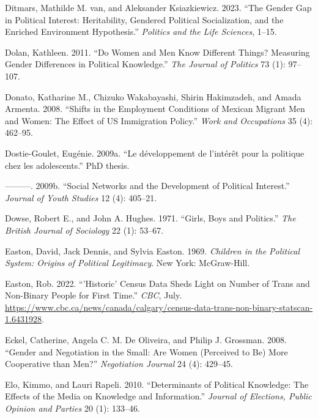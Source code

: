 \documentclass[
  letterpaper,
  DIV=11,
  numbers=noendperiod]{scrreprt}
\newlength{\cslhangindent}
\newlength{\cslentryspacingunit} %
\newenvironment{CSLReferences}[2] %
 {%
  \setlength{\parindent}{0pt}
  \ifodd #1
  \let\oldpar\par
  \def\par{\hangindent=\cslhangindent\oldpar}
  \fi
  \setlength{\parskip}{#2\cslentryspacingunit}
 }%
 {}
\begin{document}
\begin{CSLReferences}{1}{0}
\leavevmode{}%
Ditmars, Mathilde M. van, and Aleksander Ksiazkiewicz. 2023. {``{The
Gender Gap in Political Interest: Heritability, Gendered Political
Socialization, and the Enriched Environment Hypothesis}.''}
\emph{Politics and the Life Sciences}, 1--15.

\leavevmode{}%
Dolan, Kathleen. 2011. {``{Do Women and Men Know Different Things?
Measuring Gender Differences in Political Knowledge}.''} \emph{The
Journal of Politics} 73 (1): 97--107.

\leavevmode{}%
Donato, Katharine M., Chizuko Wakabayashi, Shirin Hakimzadeh, and Amada
Armenta. 2008. {``{Shifts in the Employment Conditions of Mexican
Migrant Men and Women: The Effect of US Immigration Policy}.''}
\emph{Work and Occupations} 35 (4): 462--95.

\leavevmode{}%
Dostie-Goulet, Eugénie. 2009a. {``{Le d{é}veloppement de l'int{é}r{ê}t
pour la politique chez les adolescents}.''} PhD thesis.

\leavevmode{}%
---------. 2009b. {``{Social Networks and the Development of Political
Interest}.''} \emph{Journal of Youth Studies} 12 (4): 405--21.

\leavevmode{}%
Dowse, Robert E., and John A. Hughes. 1971. {``{Girls, Boys and
Politics}.''} \emph{The British Journal of Sociology} 22 (1): 53--67.

\leavevmode{}%
Easton, David, Jack Dennis, and Sylvia Easton. 1969. \emph{{Children in
the Political System: Origins of Political Legitimacy}}. New York:
McGraw-Hill.

\leavevmode{}%
Easton, Rob. 2022. {``'Historic' Census Data Sheds Light on Number of
Trans and Non-Binary People for First Time.''} \emph{CBC}, July.
\url{https://www.cbc.ca/news/canada/calgary/census-data-trans-non-binary-statscan-1.6431928}.

\leavevmode{}%
Eckel, Catherine, Angela C. M. De Oliveira, and Philip J. Grossman.
2008. {``{Gender and Negotiation in the Small: Are Women (Perceived to
Be) More Cooperative than Men?}''} \emph{Negotiation Journal} 24 (4):
429--45.

\leavevmode{}%
Elo, Kimmo, and Lauri Rapeli. 2010. {``{Determinants of Political
Knowledge: The Effects of the Media on Knowledge and Information}.''}
\emph{Journal of Elections, Public Opinion and Parties} 20 (1): 133--46.


\end{CSLReferences}
\end{document}
